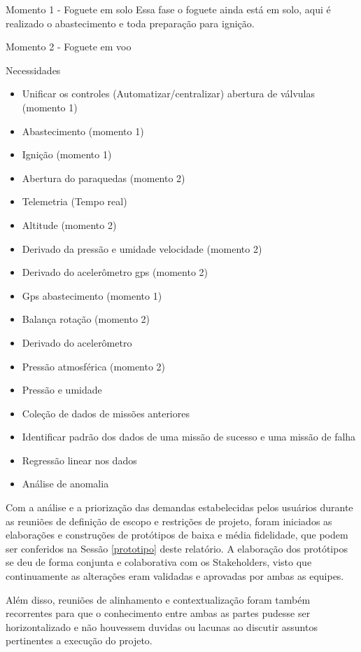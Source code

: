 \begin{apendicesenv}
Momento 1 - Foguete em solo
    Essa fase o foguete ainda está em solo, aqui é realizado o abastecimento e toda preparação para ignição.

Momento 2 - Foguete em voo

Necessidades
\begin{itemize}

\item Unificar os controles (Automatizar/centralizar)
abertura de válvulas (momento 1)
\item Abastecimento (momento 1)
\item Ignição (momento 1)
\item Abertura do paraquedas (momento 2)
\item Telemetria (Tempo real)
\item Altitude (momento 2)
\item Derivado da pressão e umidade
velocidade (momento 2)
\item Derivado do acelerômetro gps (momento 2)
\item Gps abastecimento (momento 1) 
\item Balança rotação (momento 2)
\item Derivado do acelerômetro
\item Pressão atmosférica (momento 2)
\item Pressão e umidade 
\item Coleção de dados de missões anteriores
\item Identificar padrão dos dados de uma missão de sucesso e uma missão de falha
\item Regressão linear nos dados
\item Análise de anomalia 
\end{itemize}

Com a análise e a priorização das demandas estabelecidas pelos usuários durante as reuniões de definição de escopo e restrições de projeto, foram iniciados as elaborações e construções de protótipos de baixa e média fidelidade, que podem ser conferidos na Sessão \ref{prototipo} deste relatório. A elaboração dos protótipos se deu de forma conjunta e colaborativa com os Stakeholders, visto que continuamente as alterações eram validadas e aprovadas por ambas as equipes. 

Além disso, reuniões de alinhamento e contextualização foram também recorrentes para que o conhecimento entre ambas as partes pudesse ser horizontalizado e não houvessem duvidas ou lacunas ao discutir assuntos pertinentes a execução do projeto. 


\end{apendicesenv}
